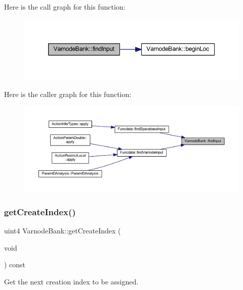 Here is the call graph for this function\+:
\nopagebreak
\begin{figure}[H]
\begin{center}
\leavevmode
\includegraphics[width=350pt]{class_varnode_bank_a5375b59862f62539df76d67de60414c6_cgraph}
\end{center}
\end{figure}
Here is the caller graph for this function\+:
\nopagebreak
\begin{figure}[H]
\begin{center}
\leavevmode
\includegraphics[width=350pt]{class_varnode_bank_a5375b59862f62539df76d67de60414c6_icgraph}
\end{center}
\end{figure}
\mbox{\label{class_varnode_bank_ab89d4b8688f2195cbdd4fd3a2b004f47}} 
\subsubsection{\texorpdfstring{getCreateIndex()}{getCreateIndex()}}
{\footnotesize\ttfamily uint4 Varnode\+Bank\+::get\+Create\+Index (\begin{DoxyParamCaption}\item[{void}]{ }\end{DoxyParamCaption}) const\hspace{0.3cm}{\ttfamily [inline]}}



Get the next creation index to be assigned. 



